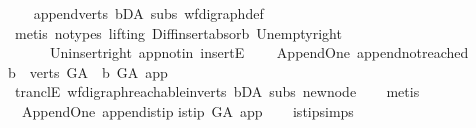 \begin{isabellebody}
\ \ \isamarkupfalse%
\ append{\isacharunderscore}{\kern0pt}verts\ bD{\isacharunderscore}{\kern0pt}A\ subs\ wf{\isacharunderscore}{\kern0pt}digraph{\isacharunderscore}{\kern0pt}def\isanewline
\ \ \isamarkupfalse%
\ {\isacharparenleft}{\kern0pt}metis\ {\isacharparenleft}{\kern0pt}no{\isacharunderscore}{\kern0pt}types{\isacharcomma}{\kern0pt}\ lifting{\isacharparenright}{\kern0pt}\ Diff{\isacharunderscore}{\kern0pt}insert{\isacharunderscore}{\kern0pt}absorb\ Un{\isacharunderscore}{\kern0pt}empty{\isacharunderscore}{\kern0pt}right\isanewline
\ \ \ \ \ \ Un{\isacharunderscore}{\kern0pt}insert{\isacharunderscore}{\kern0pt}right\ app{\isacharunderscore}{\kern0pt}notin\ insertE{\isacharparenright}{\kern0pt}\ \ \isanewline
{}\isamarkupfalse%
%
\endisatagproof
{\isafoldproof}%
%
\isadelimproof
\isanewline
%
\endisadelimproof
\isanewline
{}\isamarkupfalse%
\ {\isacharparenleft}{\kern0pt}\ Append{\isacharunderscore}{\kern0pt}One{\isacharparenright}{\kern0pt}\ append{\isacharunderscore}{\kern0pt}not{\isacharunderscore}{\kern0pt}reached{\isacharcolon}{\kern0pt}\isanewline
{\isachardoublequoteopen}{\isasymforall}b\ {\isasymin}\ verts\ G{\isacharunderscore}{\kern0pt}A{\isachardot}{\kern0pt}\ {\isasymnot}\ b\ {\isasymrightarrow}\isactrlsup {\isacharplus}{\kern0pt}\isactrlbsub G{\isacharunderscore}{\kern0pt}A\isactrlesub \ app{\isachardoublequoteclose}\isanewline
%
\isadelimproof
\ \ %
\endisadelimproof
%
\isatagproof
{}\isamarkupfalse%
\ tranclE\ wf{\isacharunderscore}{\kern0pt}digraph{\isachardot}{\kern0pt}reachable{}{\isacharunderscore}{\kern0pt}in{\isacharunderscore}{\kern0pt}verts{\isacharparenleft}{\kern0pt}{}{\isacharparenright}{\kern0pt}\ bD{\isacharunderscore}{\kern0pt}A\ subs\ new{\isacharunderscore}{\kern0pt}node\isanewline
\ \ \isamarkupfalse%
\ metis%
\endisatagproof
{\isafoldproof}%
%
\isadelimproof
\ \ \isanewline
%
\endisadelimproof
\isanewline
\isanewline
{}\isamarkupfalse%
\ {\isacharparenleft}{\kern0pt}\ Append{\isacharunderscore}{\kern0pt}One{\isacharparenright}{\kern0pt}\ append{\isacharunderscore}{\kern0pt}is{\isacharunderscore}{\kern0pt}tip{\isacharcolon}{\kern0pt}\isanewline
{\isachardoublequoteopen}is{\isacharunderscore}{\kern0pt}tip\ G{\isacharunderscore}{\kern0pt}A\ app{\isachardoublequoteclose}\isanewline
%
\isadelimproof
\ \ %
\endisadelimproof
%
\isatagproof
{}\isamarkupfalse%
\ is{\isacharunderscore}{\kern0pt}tip{\isachardot}{\kern0pt}simps\ \isanewline
\ \ \isamarkupfalse%

\end{isabellebody}
